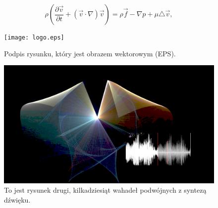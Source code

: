 \documentclass[a4paper,12pt,reqno]{article}
\begin{document}
\newpage





\newpage

\begin{equation} 
\rho\left(\frac{\partial\vec v}{\partial t}+(\vec v\cdot\nabla)\vec v\right) =\rho\vec f - \nabla p + \mu\triangle\vec v, \label{rownanie}
\end{equation} 

\begin{figure}[!ht]%
\centering
\texttt{[image: logo.eps]}
\caption{Podpis rysunku, który jest obrazem wektorowym (EPS). \label{logotyp}}
\qquad
\end{figure}   

\begin{figure}[!ht]%
\centering
\includegraphics[width=0.8\columnwidth]{pendulums.png}
\caption{To jest rysunek drugi, kilkadziesiąt wahadeł podwójnych z syntezą dźwięku.\label{wahadla}}%
%
\qquad
\end{figure} 
\end{document}
